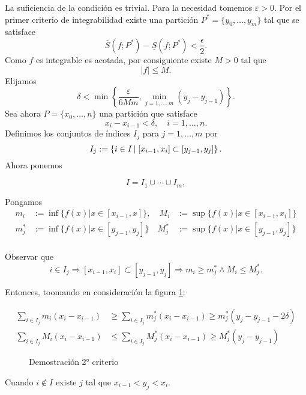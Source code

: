 \begin{demo} La suficiencia de la condición es trivial. Para la necesidad tomemos $\varepsilon>0$. Por el primer criterio de integrabilidad existe una partición $P^*=\{y_0,\ldots,y_m\}$ tal que se satisface
\[
 \overline{S}(f;P^*)-\underline{S}(f;P^*)<\frac{\epsilon}{2}.
\]
Como $f$ es integrable es acotada, por consiguiente existe $M>0$ tal que
\[
 |f|\leq M.
\]
Elijamos 
\[
 \delta<\min\left\{\frac{\varepsilon}{6Mm},\min_{j=1,\ldots,m}(y_j-y_{j-1})   \right\}  .
\]
Sea ahora $P=\{x_0,\ldots,n\}$ una partición que satisface
\[
 x_i-x_{i-1}<\delta,\quad i=1,\ldots,n.
\]
Definimos los conjuntos de índices $I_j$ para $j=1,\ldots,m$ por
\[
 I_j:=\left\{ i\in I\left|\vphantom{ \exists }\right.   [x_{i-1},x_i]\subset [y_{j-1},y_j]\right\}.
\]
Ahora ponemos

\begin{equation*}
  I=I_1\cup\cdots\cup I_m,
\end{equation*}

Pongamos
\begin{eqnarray*}
     m_i&:=\inf\{f(x)| x\in [x_{i-1},x]\},\quad     M_i&:=\sup\{f(x)| x\in [x_{i-1},x_i]\}\\
    m^*_j&:=\inf\{f(x)| x\in [y_{j-1},y_j]\}\quad
    M^*_j&:=\sup\{f(x)| x\in [y_{j-1},y_j]\}\\
\end{eqnarray*}

Observar que
\[
 i\in I_j\Rightarrow  [x_{i-1},x_i]\subset [y_{j-1},y_j]\Rightarrow
m_i\geq m^*_j \wedge M_i\leq M^*_j.
\]


Entonces, toomando en consideración la figura \ref{fig:crite2}:

\begin{equation}\label{eq:2drite_estima_suma}
 \begin{split}
   \sum_{i\in I_j}m_i(x_i-x_{i-1})&\geq \sum_{i\in I_j}m^*_j(x_i-x_{i-1}) \geq  m^*_j(y_j-y_{j-1}-2\delta)\\
 \sum_{i\in I_j}M_i(x_i-x_{i-1})&\leq \sum_{i\in I_j}M^*_j(x_i-x_{i-1}) \geq  M^*_j(y_j-y_{j-1})
 \end{split}
\end{equation}
\begin{figure}[H]
 \begin{center}

 \end{center}
 \caption{Demostración 2° criterio}\label{fig:crite2}
\end{figure}

Cuando  $i\notin I $  existe $j$ tal que $x_{i-1}<y_j<x_i$. 


\end{demo}

